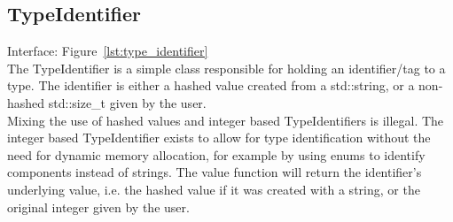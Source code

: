 \subsection{TypeIdentifier}
Interface: Figure~\ref{lst:type_identifier}\\\noindent
The TypeIdentifier is a simple class responsible for holding an identifier/tag to a type. 
The identifier is either a hashed value created from a std::string, or a non-hashed std::size\_t given by the user.\\
Mixing the use of hashed values and integer based TypeIdentifiers is illegal. 
The integer based TypeIdentifier exists to allow for type identification without the need for dynamic
memory allocation, for example by using enums to identify components instead of strings.
The value function will return the identifier's underlying value, i.e. the hashed value if it was created with a string, 
or the original integer given by the user.
